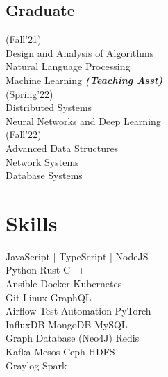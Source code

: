 \documentclass[]{deedy-resume-openfont}
\begin{document}
\begin{minipage}[t]{0.33\textwidth}
\subsection{Graduate}
(Fall'21)\\
\textbullet{} Design and Analysis of Algorithms \\
\textbullet{} Natural Language Processing \\
\textbullet{} Machine Learning
{\footnotesize \textit{\textbf{(Teaching Asst) }}}
\\(Spring'22)\\
\textbullet{} Distributed Systems \\
\textbullet{} Neural Networks and Deep Learning \\
(Fall'22)\\
\textbullet{} Advanced Data Structures \\
\textbullet{} Network Systems \\
\textbullet{} Database Systems
\sectionsep


\section{Skills}
\textbullet{} JavaScript | TypeScript | NodeJS \\
\textbullet{} Python \textbullet{} Rust \textbullet{} C++  \\

\textbullet{} Ansible \textbullet{} Docker \textbullet{} Kubernetes \\
\textbullet{} Git \textbullet{} Linux \textbullet{} GraphQL \\
\textbullet{} Airflow \textbullet{} Test Automation \textbullet{} PyTorch \\
\textbullet{} InfluxDB \textbullet{} MongoDB \textbullet{} MySQL \\
\textbullet{} Graph Database (Neo4J) \textbullet{} Redis \\
\textbullet{} Kafka \textbullet{} Mesos \textbullet{} Ceph \textbullet{} HDFS \\
\textbullet{} Graylog \textbullet{} Spark \\
\sectionsep

%
%

\end{minipage} 
\end{document}
